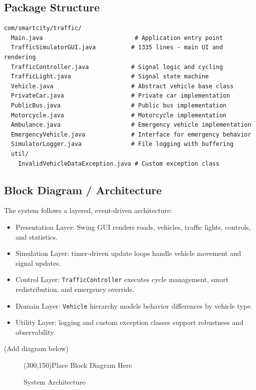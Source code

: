 \documentclass[12pt,a4paper]{article}
\begin{document}
\subsection{Package Structure}
\begin{lstlisting}
com/smartcity/traffic/
  Main.java                          # Application entry point
  TrafficSimulatorGUI.java          # 1335 lines - main UI and rendering
  TrafficController.java            # Signal logic and cycling
  TrafficLight.java                 # Signal state machine
  Vehicle.java                      # Abstract vehicle base class
  PrivateCar.java                   # Private car implementation
  PublicBus.java                    # Public bus implementation
  Motorcycle.java                   # Motorcycle implementation
  Ambulance.java                    # Emergency vehicle implementation
  EmergencyVehicle.java             # Interface for emergency behavior
  SimulatorLogger.java              # File logging with buffering
  util/
    InvalidVehicleDataException.java # Custom exception class
\end{lstlisting}

\newpage
\subsection{Block Diagram / Architecture}
The system follows a layered, event-driven architecture:
\begin{itemize}
    \item Presentation Layer: Swing GUI renders roads, vehicles, traffic lights, controls, and statistics.
    \item Simulation Layer: timer-driven update loops handle vehicle movement and signal updates.
    \item Control Layer: \texttt{TrafficController} executes cycle management, smart redistribution, and emergency override.
    \item Domain Layer: \texttt{Vehicle} hierarchy models behavior differences by vehicle type.
    \item Utility Layer: logging and custom exception classes support robustness and observability.
\end{itemize}

(Add diagram below)
\begin{figure}[h]
    \centering
    \framebox(300,150){Place Block Diagram Here} %
    \caption{System Architecture}
\end{figure}
\end{document}
